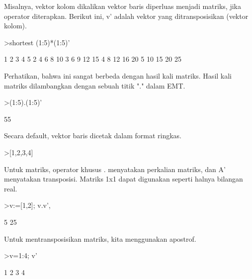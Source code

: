 \documentclass[a4paper,10pt]{article}
\begin{document}
\begin{eulernotebook}
\begin{eulercomment}
\begin{eulercomment}
\begin{eulercomment}
\begin{eulercomment}
\begin{eulercomment}
\begin{eulercomment}
\begin{eulercomment}
Misalnya, vektor kolom dikalikan vektor baris diperluas menjadi
matriks, jika operator diterapkan. Berikut ini, v' adalah vektor yang
ditransposisikan (vektor kolom).
\end{eulercomment}
\begin{eulerprompt}
>shortest (1:5)*(1:5)'
\end{eulerprompt}
\begin{euleroutput}
       1      2      3      4      5 
       2      4      6      8     10 
       3      6      9     12     15 
       4      8     12     16     20 
       5     10     15     20     25 
\end{euleroutput}
\begin{eulercomment}
Perhatikan, bahwa ini sangat berbeda dengan hasil kali matriks. Hasil
kali matriks dilambangkan dengan sebuah titik "." dalam EMT.
\end{eulercomment}
\begin{eulerprompt}
>(1:5).(1:5)'
\end{eulerprompt}
\begin{euleroutput}
  55
\end{euleroutput}
\begin{eulercomment}
Secara default, vektor baris dicetak dalam format ringkas.
\end{eulercomment}
\begin{eulerprompt}
>[1,2,3,4]
\end{eulerprompt}
\begin{euleroutput}
  [1,  2,  3,  4]
\end{euleroutput}
\begin{eulercomment}
Untuk matriks, operator khusus . menyatakan perkalian matriks, dan A'
menyatakan transposisi. Matriks 1x1 dapat digunakan seperti halnya
bilangan real.
\end{eulercomment}
\begin{eulerprompt}
>v:=[1,2]; v.v', %
\end{eulerprompt}
\begin{euleroutput}
  5
  25
\end{euleroutput}
\begin{eulercomment}
Untuk mentransposisikan matriks, kita menggunakan apostrof.
\end{eulercomment}
\begin{eulerprompt}
>v=1:4; v'
\end{eulerprompt}
\begin{euleroutput}
              1 
              2 
              3 
              4 

\end{euleroutput}
\end{eulercomment}
\end{eulercomment}
\end{eulercomment}
\end{eulercomment}
\end{eulercomment}
\end{eulercomment}
\end{eulernotebook}
\end{document}
